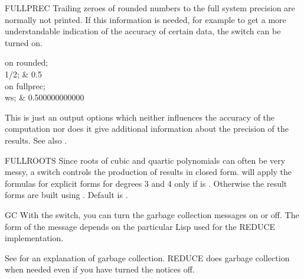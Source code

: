 \begin{Switch}{FULLPREC}
Trailing zeroes of rounded numbers to the full system precision are
normally not printed.  If this information is needed, for example to get a
more understandable indication of the accuracy of certain data, the switch
 can be turned on.

\begin{Examples}
on rounded; \\
1/2;  & 0.5 \\
on fullprec; \\
ws; & 0.500000000000
\end{Examples}

\begin{Comments}
This is just an output options which neither influences
the accuracy of the computation nor does it give additional
information about the precision of the results.
See also .
\end{Comments}
\end{Switch}

\begin{Switch}{FULLROOTS}
Since roots of cubic and quartic polynomials can often be very
messy, a switch  controls the production
of results in closed form.  will apply the
formulas for explicit forms for degrees 3 and 4 only if
 is . Otherwise the result forms
are built using . Default is .
\end{Switch}

\begin{Switch}{GC}
With the  switch, you can turn the garbage collection messages on
or off.  The form of the message depends on the particular Lisp used for
the REDUCE implementation.

\begin{Comments}
See  for an explanation of garbage collection.  REDUCE does
garbage collection when needed even if you have turned the notices off.
\end{Comments}
\end{Switch}


